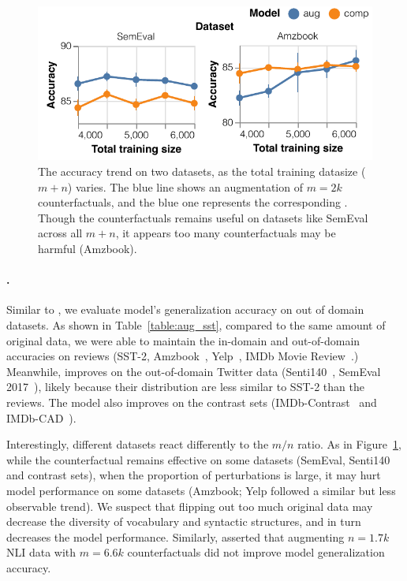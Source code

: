\begin{figure}[t]
\centering
\includegraphics[width=1\columnwidth]{figures/sst_trend_2}
\vspace{-15pt}
\caption{The accuracy trend on two \sst datasets, as the total training datasize ($m+n$) varies. The blue line shows an augmentation of $m=2k$ counterfactuals, and the blue one represents the corresponding \mcomp.
Though the counterfactuals remains useful on datasets like SemEval across all $m+n$, it appears too many counterfactuals may be harmful (Amzbook).
}
\vspace{-10pt}
\label{fig:sst_trend}
\end{figure}

\paragraph{\sst.}
Similar to \citet{kaushik2019learning}, we evaluate \sst model's generalization accuracy on out of domain datasets.
As shown in Table~\ref{table:aug_sst}, compared to the same amount of original data, we were able to maintain the in-domain and out-of-domain accuracies on reviews (SST-2, Amzbook~\cite{ni2019justifying}, Yelp~\cite{asghar2016yelp}, IMDb Movie Review~\cite{maas2011learning}.)
Meanwhile, \maug improves on the out-of-domain Twitter data (Senti140~\cite{go2009twitter}, SemEval 2017~\cite{rosenthal2017semeval}), likely because their distribution are less similar to SST-2 than the reviews.
The model also improves on the contrast sets (IMDb-Contrast~\cite{gardner2020contrast} and IMDb-CAD~\cite{kaushik2019learning}).

Interestingly, different datasets react differently to the $m/n$ ratio.
As in Figure~\ref{fig:sst_trend}, while the counterfactual remains effective on some datasets (\eg SemEval, Senti140 and contrast sets), when the proportion of perturbations is large, it may hurt model performance on some datasets (Amzbook; Yelp followed a similar but less observable trend).
We suspect that flipping out too much original data may decrease the diversity of vocabulary and syntactic structures, and in turn decreases the model performance.
Similarly, \citet{huang2020counterfactually} asserted that augmenting $n=1.7k$ NLI data with $m=6.6k$ counterfactuals did not improve model generalization accuracy.

